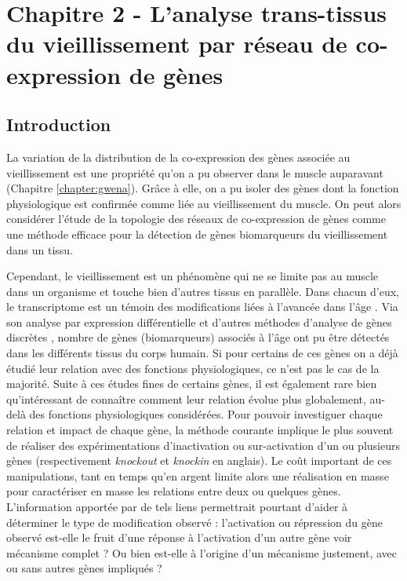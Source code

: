\chapter{Chapitre 2 - L'analyse trans-tissus du vieillissement par réseau de co-expression de gènes}
\label{chapter:multidim}

\section{Introduction}

La variation de la distribution de la co-expression des gènes associée au vieillissement est une propriété qu'on a pu observer dans le muscle auparavant (Chapitre \ref{chapter:gwena}). Grâce à elle, on a pu isoler des gènes dont la fonction physiologique  est confirmée comme liée au vieillissement du muscle. On peut alors considérer l'étude de la topologie des réseaux de co-expression de gènes comme une méthode efficace pour la détection de gènes biomarqueurs du vieillissement dans un tissu. 

Cependant, le vieillissement est un phénomène qui ne se limite pas au muscle dans un organisme et touche bien d'autres tissus en parallèle. Dans chacun d'eux, le transcriptome est un témoin des modifications liées à l'avancée dans l'âge . Via son analyse par expression différentielle et d'autres méthodes d'analyse de gènes discrètes , nombre de gènes (biomarqueurs) associés à l'âge ont pu être détectés dans les différents tissus du corps humain. Si pour certains de ces gènes on a déjà étudié leur relation avec des fonctions physiologiques, ce n'est pas le cas de la majorité. Suite à ces études fines de certains gènes, il est également rare bien qu'intéressant de connaître comment leur relation évolue plus globalement, au-delà des fonctions physiologiques considérées.
Pour pouvoir investiguer chaque relation et impact de chaque gène, la méthode courante implique le plus souvent de réaliser des expérimentations d'inactivation ou sur-activation d'un ou plusieurs gènes (respectivement \textit{knockout} et \textit{knockin} en anglais). Le coût important de ces manipulations, tant en temps qu'en argent limite alors une réalisation en masse pour caractériser en masse les relations entre deux ou quelques gènes. 
L'information apportée par de tels liens permettrait pourtant d'aider à déterminer le type de modification observé  : l'activation ou répression du gène observé est-elle le fruit d'une réponse à l'activation d'un autre gène voir mécanisme  complet ? Ou bien est-elle à l'origine d'un mécanisme justement, avec ou sans autres gènes impliqués ? 

